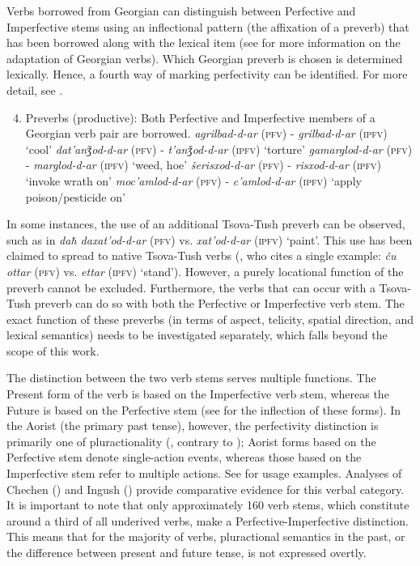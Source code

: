 Verbs borrowed from Georgian can distinguish between Perfective and Imperfective stems using an inflectional pattern (the affixation of a preverb) that has been borrowed along with the lexical item (see  for more information on the adaptation of Georgian verbs). Which Georgian preverb is chosen is determined lexically. Hence, a fourth way of marking perfectivity can be identified. For more detail, see .
\begin{enumerate}
	\setcounter{enumi}{3}
	\item Preverbs (productive): Both Perfective and Imperfective members of a Georgian verb pair are borrowed.
	\subitem  \textit{agrilbad-d-ar} (\textsc{pfv}) - \textit{grilbad-d-ar} (\textsc{ipfv}) `cool'
	\subitem \textit{dat'anǯod-d-ar} (\textsc{pfv}) - \textit{t'anǯod-d-ar} (\textsc{ipfv}) `torture'
	\subitem \textit{gamarglod-d-ar} (\textsc{pfv}) - \textit{marglod-d-ar} (\textsc{ipfv}) `weed, hoe'
	\subitem \textit{šerisxod-d-ar} (\textsc{pfv}) - \textit{risxod-d-ar} (\textsc{ipfv}) `invoke wrath on'
	\subitem \textit{moc'amlod-d-ar} (\textsc{pfv}) - \textit{c'amlod-d-ar} (\textsc{ipfv}) `apply poison/pesticide on'
\end{enumerate}

In some instances, the use of an additional Tsova-Tush preverb can be observed, such as in \textit{daħ daxat'od-d-ar} (\textsc{pfv}) vs. \textit{xat'od-d-ar} (\textsc{ipfv}) `paint’. This use has been claimed to spread to native Tsova-Tush verbs
(\cite{tetradze}, who cites a single example: \textit{ču ottar} (\textsc{pfv}) vs. \textit{ettar} (\textsc{ipfv}) `stand’). However, a purely locational function of the preverb cannot be excluded. Furthermore, the verbs that can occur with a Tsova-Tush preverb can do so with both the Perfective or Imperfective verb stem. The exact function of these preverbs (in terms of aspect, telicity, spatial direction, and lexical semantics) needs to be investigated separately, which falls beyond the scope of this work.

The distinction between the two verb stems serves multiple functions. The Present form of the verb is based on the Imperfective verb stem, whereas the Future is based on the Perfective stem (see  for the inflection of these forms). In the Aorist (the primary past tense), however, the perfectivity distinction is primarily one of pluractionality (\cite{holiskygagua,holisky85}, contrary to \cites{gagua62}[52]{schiefner59}); Aorist forms based on the Perfective stem denote single-action events, whereas those based on the Imperfective stem refer to multiple actions. See  for usage examples. Analyses of Chechen (\cite{yu2003pluract}) and Ingush (\cite[313--318]{nichols11}) provide comparative evidence for this verbal category. It is important to note that only approximately 160 verb stems, which constitute around a third of all underived verbs, make a Perfective-Imperfective distinction. This means that for the majority of verbs, pluractional semantics in the past, or the difference between present and future tense, is not expressed overtly.

